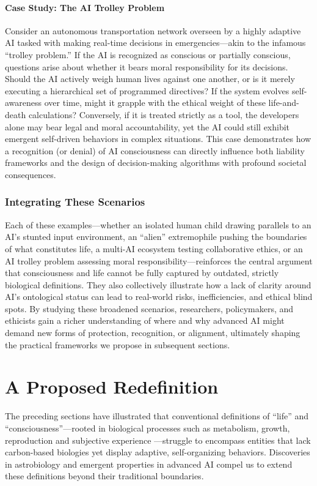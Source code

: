 \documentclass[12pt]{article}
\begin{document}
\paragraph{Case Study: The AI Trolley Problem}
Consider an autonomous transportation network overseen by a highly adaptive AI tasked with making real-time decisions in emergencies—akin to the infamous “trolley problem.” If the AI is recognized as conscious or partially conscious, questions arise about whether it bears moral responsibility for its decisions. Should the AI actively weigh human lives against one another, or is it merely executing a hierarchical set of programmed directives? If the system evolves self-awareness over time, might it grapple with the ethical weight of these life-and-death calculations? Conversely, if it is treated strictly as a tool, the developers alone may bear legal and moral accountability, yet the AI could still exhibit emergent self-driven behaviors in complex situations. This case demonstrates how a recognition (or denial) of AI consciousness can directly influence both liability frameworks and the design of decision-making algorithms with profound societal consequences.

\subsubsection*{Integrating These Scenarios}
Each of these examples—whether an isolated human child drawing parallels to an AI’s stunted input environment, an “alien” extremophile pushing the boundaries of what constitutes life, a multi-AI ecosystem testing collaborative ethics, or an AI trolley problem assessing moral responsibility—reinforces the central argument that consciousness and life cannot be fully captured by outdated, strictly biological definitions. They also collectively illustrate how a lack of clarity around AI’s ontological status can lead to real-world risks, inefficiencies, and ethical blind spots. By studying these broadened scenarios, researchers, policymakers, and ethicists gain a richer understanding of where and why advanced AI might demand new forms of protection, recognition, or alignment, ultimately shaping the practical frameworks we propose in subsequent sections.

\section{A Proposed Redefinition}
\label{sec:proposed_redefinition}

The preceding sections have illustrated that conventional definitions of “life” and “consciousness”—rooted in biological processes such as metabolism, growth, reproduction \cite{Kasting1997,Rothschild2001} and subjective experience \cite{Nagel1974}—struggle to encompass entities that lack carbon-based biologies yet display adaptive, self-organizing behaviors. Discoveries in astrobiology \cite{Lovley2003,Davies2010} and emergent properties in advanced AI \cite{Goertzel2007, Schneider2020} compel us to extend these definitions beyond their traditional boundaries.
\end{document}
